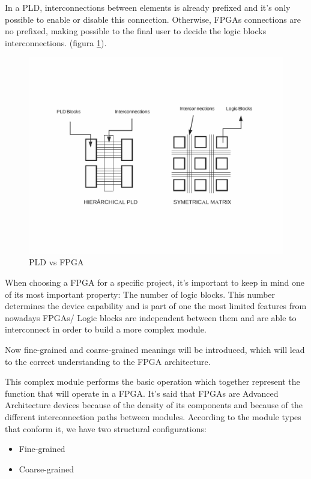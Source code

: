In a PLD, interconnections between elements is already prefixed and it’s only possible to enable or disable this connection. Otherwise, FPGAs connections are no prefixed, making possible to the final user to decide the logic blocks interconnections. (figura \ref{fig:pld_fpga}).
\newline
\begin{center}
\begin{figure}[H]
	\center
	\includegraphics[trim = 10mm 35mm 10mm 35mm, clip,scale=0.4]{imagenes/EstadoArte/pld_fpga.pdf}
	\caption{PLD vs FPGA}
	\label{fig:pld_fpga}
\end{figure}

\end{center}

When choosing a FPGA for a specific project, it’s important to keep in mind one of its most important property: The number of logic blocks. This number determines the device capability and is part of one the most limited features from nowadays FPGAs/ Logic blocks are independent between them and are able to interconnect in order to build a more complex module. \newline

Now fine-grained and coarse-grained meanings will be introduced, which will lead to the correct understanding to the FPGA architecture. 

This complex module performs the basic operation which together represent the function that will operate in a FPGA. It’s said that FPGAs are Advanced Architecture devices because of the density of its components and because of the different interconnection paths between modules. According to the module types that conform it, we have two structural configurations:
\begin{itemize}
	\item Fine-grained
	\item Coarse-grained
\end{itemize}

